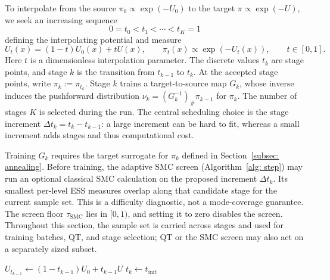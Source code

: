 \documentclass{article}
\begin{document}
To interpolate from the source $\pi_0 \propto \exp(-U_0)$ to the target $\pi \propto \exp(-U)$, we seek an increasing sequence
\begin{equation*}
    0 = t_0 < t_1 < \cdots < t_K = 1
\end{equation*}
defining the interpolating potential and measure
\begin{equation*}
    U_t(x)=(1-t)U_0(x)+tU(x),
\qquad \pi_t(x)\propto\exp(-U_t(x)),
    \qquad t\in[0,1].
\end{equation*}
Here $t$ is a dimensionless interpolation parameter. The discrete values $t_k$ are stage points, and stage $k$ is the transition from $t_{k-1}$ to $t_k$. At the accepted stage points, write $\pi_k:=\pi_{t_k}$. Stage $k$ trains a target-to-source map $G_k$, whose inverse induces the pushforward distribution $\nu_k=(G_k^{-1})_{\#}\pi_{k-1}$ for $\pi_k$. The number of stages $K$ is selected during the run. The central scheduling choice is the stage increment $\Delta t_k=t_k-t_{k-1}$: a large increment can be hard to fit, whereas a small increment adds stages {\color{blue}and thus computational cost}.

Training $G_k$ requires the target surrogate for $\pi_k$ defined in Section~\ref{subsec: annealing}. Before training, the adaptive SMC screen (Algorithm~\ref{alg: step}) may run an optional classical SMC calculation on the proposed increment $\Delta t_k$. Its smallest per-level ESS measures overlap along that candidate stage for the current sample set. This is a difficulty diagnostic, not a mode-coverage guarantee. The screen floor $\tau_{\mathrm{SMC}}$ lies in $[0,1)$, and setting it to zero disables the screen. Throughout this section, the sample set is carried across stages and used for training batches, QT, and stage selection; QT or the SMC screen may also act on a separately sized subset.

\begin{algorithm}[htb]
\caption{Adaptive selection of the stage increment $\Delta t_k$}
\label{alg: step}

$U_{t_{k-1}} \gets (1-t_{k-1}) U_0 + t_{k-1} U$\;
$t_k \gets t_{\mathrm{init}}$\;
\end{algorithm}
\end{document}
